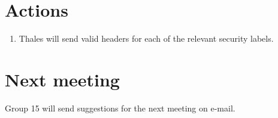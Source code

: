\documentclass[a4paper,12pt]{article}
\begin{document}
\section{Actions}
\begin{enumerate}
\item
Thales will send valid headers for each of the relevant security labels.
\end{enumerate}
\section{Next meeting}
Group 15 will send suggestions for the next meeting on e-mail. 
\end{document}
